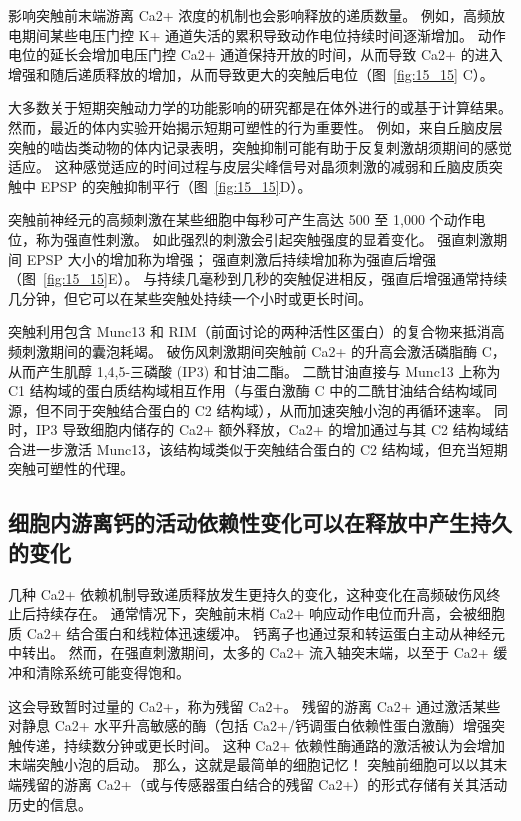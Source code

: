 影响突触前末端游离 Ca2+ 浓度的机制也会影响释放的递质数量。
例如，高频放电期间某些电压门控 K+ 通道失活的累积导致动作电位持续时间逐渐增加。
动作电位的延长会增加电压门控 Ca2+ 通道保持开放的时间，从而导致 Ca2+ 的进入增强和随后递质释放的增加，从而导致更大的突触后电位（图~\ref{fig:15_15} C）。


大多数关于短期突触动力学的功能影响的研究都是在体外进行的或基于计算结果。
然而，最近的体内实验开始揭示短期可塑性的行为重要性。
例如，来自丘脑皮层突触的啮齿类动物的体内记录表明，突触抑制可能有助于反复刺激胡须期间的感觉适应。
这种感觉适应的时间过程与皮层尖峰信号对晶须刺激的减弱和丘脑皮质突触中 EPSP 的突触抑制平行（图~\ref{fig:15_15}D）。


突触前神经元的高频刺激在某些细胞中每秒可产生高达 500 至 1,000 个动作电位，称为强直性刺激。
如此强烈的刺激会引起突触强度的显着变化。
强直刺激期间 EPSP 大小的增加称为增强；
强直刺激后持续增加称为强直后增强（图~\ref{fig:15_15}E）。
与持续几毫秒到几秒的突触促进相反，强直后增强通常持续几分钟，但它可以在某些突触处持续一个小时或更长时间。


突触利用包含 Munc13 和 RIM（前面讨论的两种活性区蛋白）的复合物来抵消高频刺激期间的囊泡耗竭。
破伤风刺激期间突触前 Ca2+ 的升高会激活磷脂酶 C，从而产生肌醇 1,4,5-三磷酸 (IP3) 和甘油二酯。
二酰甘油直接与 Munc13 上称为 C1 结构域的蛋白质结构域相互作用（与蛋白激酶 C 中的二酰甘油结合结构域同源，但不同于突触结合蛋白的 C2 结构域），从而加速突触小泡的再循环速率。
同时，IP3 导致细胞内储存的 Ca2+ 额外释放，Ca2+ 的增加通过与其 C2 结构域结合进一步激活 Munc13，该结构域类似于突触结合蛋白的 C2 结构域，但充当短期突触可塑性的代理。



\subsection{细胞内游离钙的活动依赖性变化可以在释放中产生持久的变化}

几种 Ca2+ 依赖机制导致递质释放发生更持久的变化，这种变化在高频破伤风终止后持续存在。
通常情况下，突触前末梢 Ca2+ 响应动作电位而升高，会被细胞质 Ca2+ 结合蛋白和线粒体迅速缓冲。
钙离子也通过泵和转运蛋白主动从神经元中转出。
然而，在强直刺激期间，太多的 Ca2+ 流入轴突末端，以至于 Ca2+ 缓冲和清除系统可能变得饱和。


这会导致暂时过量的 Ca2+，称为残留 Ca2+。
残留的游离 Ca2+ 通过激活某些对静息 Ca2+ 水平升高敏感的酶（包括 Ca2+/钙调蛋白依赖性蛋白激酶）增强突触传递，持续数分钟或更长时间。
这种 Ca2+ 依赖性酶通路的激活被认为会增加末端突触小泡的启动。
那么，这就是最简单的细胞记忆！
突触前细胞可以以其末端残留的游离 Ca2+（或与传感器蛋白结合的残留 Ca2+）的形式存储有关其活动历史的信息。


